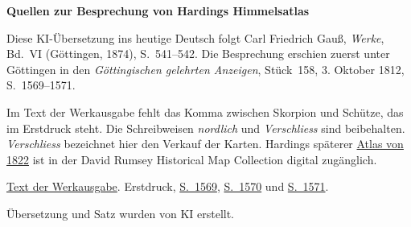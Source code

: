 \clearpage\thispagestyle{empty}
\begin{center}\textbf{Quellen zur Besprechung von Hardings Himmelsatlas}\end{center}
\noindent Diese KI-Übersetzung ins heutige Deutsch folgt Carl Friedrich Gauß, \textit{Werke}, Bd.~VI (Göttingen, 1874), S.~541--542. Die Besprechung erschien zuerst unter Göttingen in den \textit{Göttingischen gelehrten Anzeigen}, Stück~158, 3. Oktober 1812, S.~1569--1571.
\par\smallskip\noindent Im Text der Werkausgabe fehlt das Komma zwischen Skorpion und Schütze, das im Erstdruck steht. Die Schreibweisen \textit{nordlich} und \textit{Verschliess} sind beibehalten. \textit{Verschliess} bezeichnet hier den Verkauf der Karten. Hardings späterer \href{https://www.davidrumsey.com/luna/servlet/detail/RUMSEY~8~1~372238~90138977:Title--Atlas-novus-coelestis-XXVII-}{Atlas von 1822} ist in der David Rumsey Historical Map Collection digital zugänglich.
\par\smallskip\noindent \href{https://gdz.sub.uni-goettingen.de/id/PPN236007467}{Text der Werkausgabe}. Erstdruck, \href{https://images.p.sub.uni-goettingen.de/iiif/image/gdz:PPN319721507_1812:00001613/full/1650,/0/default.jpg}{S.~1569}, \href{https://images.p.sub.uni-goettingen.de/iiif/image/gdz:PPN319721507_1812:00001614/full/1650,/0/default.jpg}{S.~1570} und \href{https://images.p.sub.uni-goettingen.de/iiif/image/gdz:PPN319721507_1812:00001615/full/1650,/0/default.jpg}{S.~1571}.
\par\smallskip\noindent Übersetzung und Satz wurden von KI erstellt.
\clearpage
